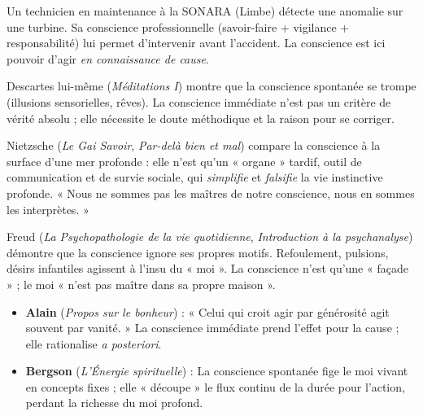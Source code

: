 \documentclass[11pt]{article}
\newcounter{popsec}
\newcounter{popsub}
\newcommand{\courssub}[1]{%
  \stepcounter{popsub}%
  \par\vspace{9pt}\noindent{\popxbold\fontsize{11.5}{13}\selectfont\color{popink}{\color{poporange}\thepopsec.\thepopsub}\hspace{6pt}#1}\par\nopagebreak\vspace{4pt}
}
\begin{document}
\begin{exemplebox}
Un technicien en maintenance à la SONARA (Limbe) détecte une anomalie sur une turbine. Sa conscience professionnelle (savoir-faire + vigilance + responsabilité) lui permet d'intervenir avant l'accident. La conscience est ici pouvoir d'agir \emph{en connaissance de cause}.
\end{exemplebox}

\courssub{Les limites de la conscience}

\begin{propriete}
Descartes lui-même (\emph{Méditations I}) montre que la conscience spontanée se trompe (illusions sensorielles, rêves). La conscience immédiate n'est pas un critère de vérité absolu ; elle nécessite le doute méthodique et la raison pour se corriger.
\end{propriete}

\begin{propriete}
Nietzsche (\emph{Le Gai Savoir}, \emph{Par-delà bien et mal}) compare la conscience à la surface d'une mer profonde : elle n'est qu'un « organe » tardif, outil de communication et de survie sociale, qui \emph{simplifie} et \emph{falsifie} la vie instinctive profonde. « Nous ne sommes pas les maîtres de notre conscience, nous en sommes les interprètes. »
\end{propriete}

\begin{propriete}
Freud (\emph{La Psychopathologie de la vie quotidienne}, \emph{Introduction à la psychanalyse}) démontre que la conscience ignore ses propres motifs. Refoulement, pulsions, désirs infantiles agissent à l'insu du « moi ». La conscience n'est qu'une « façade » ; le moi « n'est pas maître dans sa propre maison ».
\end{propriete}

\begin{propriete}
\begin{itemize}
\item \textbf{Alain} (\emph{Propos sur le bonheur}) : « Celui qui croit agir par générosité agit souvent par vanité. » La conscience immédiate prend l'effet pour la cause ; elle rationalise \emph{a posteriori}.
\item \textbf{Bergson} (\emph{L'Énergie spirituelle}) : La conscience spontanée fige le moi vivant en concepts fixes ; elle « découpe » le flux continu de la durée pour l'action, perdant la richesse du moi profond.
\end{itemize}
\end{propriete}
\end{document}
